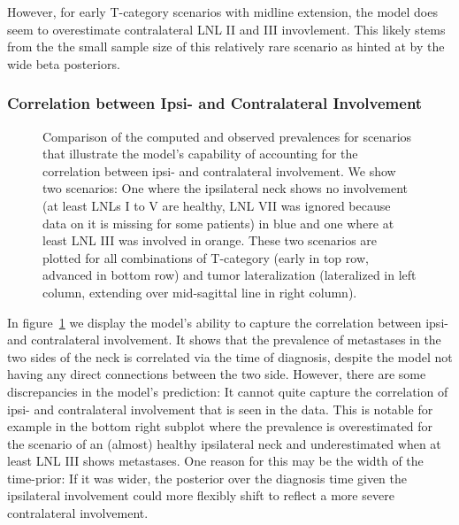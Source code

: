 \documentclass[
  sn-mathphys-num,
]{sn-jnl}
\begin{document}
However, for early T-category scenarios with midline extension, the
model does seem to overestimate contralateral LNL II and III
invovlement. This likely stems from the the small sample size of this
relatively rare scenario as hinted at by the wide beta posteriors.

\subsubsection{Correlation between Ipsi- and Contralateral
Involvement}\label{correlation-between-ipsi--and-contralateral-involvement}

\begin{figure}


\caption{\label{fig-model-prevalences-with-ipsi}Comparison of the
computed and observed prevalences for scenarios that illustrate the
model's capability of accounting for the correlation between ipsi- and
contralateral involvement. We show two scenarios: One where the
ipsilateral neck shows no involvement (at least LNLs I to V are healthy,
LNL VII was ignored because data on it is missing for some patients) in
blue and one where at least LNL III was involved in orange. These two
scenarios are plotted for all combinations of T-category (early in top
row, advanced in bottom row) and tumor lateralization (lateralized in
left column, extending over mid-sagittal line in right column).}

\end{figure}%

In figure~\ref{fig-model-prevalences-with-ipsi} we display the model's
ability to capture the correlation between ipsi- and contralateral
involvement. It shows that the prevalence of metastases in the two sides
of the neck is correlated via the time of diagnosis, despite the model
not having any direct connections between the two side. However, there
are some discrepancies in the model's prediction: It cannot quite
capture the correlation of ipsi- and contralateral involvement that is
seen in the data. This is notable for example in the bottom right
subplot where the prevalence is overestimated for the scenario of an
(almost) healthy ipsilateral neck and underestimated when at least LNL
III shows metastases. One reason for this may be the width of the
time-prior: If it was wider, the posterior over the diagnosis time given
the ipsilateral involvement could more flexibly shift to reflect a more
severe contralateral involvement.
\end{document}
